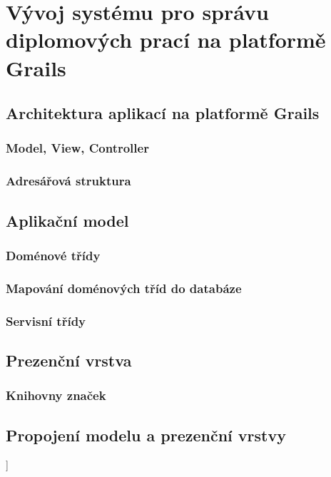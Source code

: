\chapter{Vývoj systému pro správu diplomových prací na platformě Grails}
\blindtext

\section{Architektura aplikací na platformě Grails}
\blindtext[2]

\subsection{Model, View, Controller}
\blindtext

\subsection{Adresářová struktura}
\blindtext

\section{Aplikační model}
\blindtext[2]

\subsection{Doménové třídy}
\blindtext[2]

\subsection{Mapování doménových tříd do databáze}
\blindtext[2]

\subsection{Servisní třídy}
\blindtext[2]

\section{Prezenční vrstva}
\blindtext[2]

\subsection{Knihovny značek}
\blindtext

\section{Propojení modelu a prezenční vrstvy}
\blindtext[2]

]

